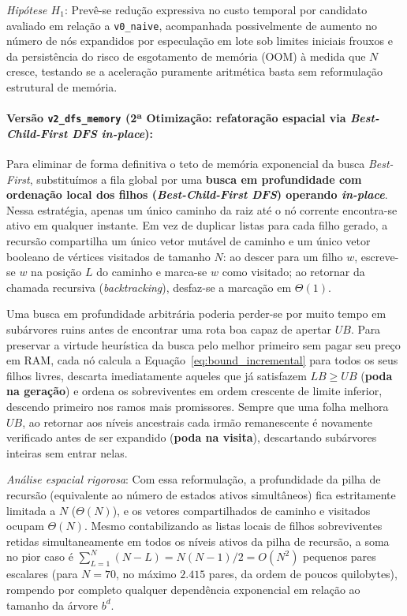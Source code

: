 \textit{Hipótese $H_1$}: Prevê-se redução expressiva no custo temporal por candidato avaliado em
relação a \texttt{v0\_naive}, acompanhada possivelmente de aumento no número de nós expandidos
por especulação em lote sob limites iniciais frouxos e da persistência do risco de esgotamento
de memória (OOM) à medida que $N$ cresce, testando se a aceleração puramente aritmética basta
sem reformulação estrutural de memória.

\paragraph{Versão \texttt{v2\_dfs\_memory} (2ª Otimização: refatoração espacial via \textit{Best-Child-First DFS in-place}):}
Para eliminar de forma definitiva o teto de memória exponencial da busca \textit{Best-First},
substituímos a fila global por uma \textbf{busca em profundidade com ordenação local dos filhos
(\textit{Best-Child-First DFS}) operando \textit{in-place}}. Nessa estratégia, apenas um único
caminho da raiz até o nó corrente encontra-se ativo em qualquer instante. Em vez de duplicar
listas para cada filho gerado, a recursão compartilha um único vetor mutável de caminho e um
único vetor booleano de vértices visitados de tamanho $N$: ao descer para um filho $w$,
escreve-se $w$ na posição $L$ do caminho e marca-se $w$ como visitado; ao retornar da chamada
recursiva (\textit{backtracking}), desfaz-se a marcação em $\Theta(1)$.

Uma busca em profundidade arbitrária poderia perder-se por muito tempo em subárvores ruins antes
de encontrar uma rota boa capaz de apertar $UB$. Para preservar a virtude heurística da busca
pelo melhor primeiro sem pagar seu preço em RAM, cada nó calcula a
Equação~\eqref{eq:bound_incremental} para todos os seus filhos livres, descarta imediatamente
aqueles que já satisfazem $LB \ge UB$ (\textbf{poda na geração}) e ordena os sobreviventes em
ordem crescente de limite inferior, descendo primeiro nos ramos mais promissores. Sempre que
uma folha melhora $UB$, ao retornar aos níveis ancestrais cada irmão remanescente é novamente
verificado antes de ser expandido (\textbf{poda na visita}), descartando subárvores inteiras
sem entrar nelas.

\textit{Análise espacial rigorosa}: Com essa reformulação, a profundidade da pilha de recursão
(equivalente ao número de estados ativos simultâneos) fica estritamente limitada a $N$
($\Theta(N)$), e os vetores compartilhados de caminho e visitados ocupam $\Theta(N)$. Mesmo
contabilizando as listas locais de filhos sobreviventes retidas simultaneamente em todos os
níveis ativos da pilha de recursão, a soma no pior caso é
$\sum_{L=1}^{N} (N - L) = N(N - 1)/2 = O(N^2)$ pequenos pares escalares (para $N = 70$, no
máximo $2.415$ pares, da ordem de poucos quilobytes), rompendo por completo qualquer
dependência exponencial em relação ao tamanho da árvore $b^d$.

